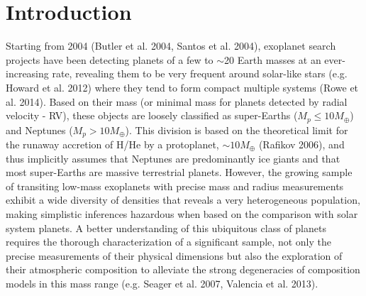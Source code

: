 \documentclass[traditabstract]{aa}
\begin{document}
\maketitle

\section{Introduction}

Starting from 2004 (Butler et al. 2004, Santos et al. 2004), exoplanet search projects have been 
detecting  planets of a few to $\sim$20 Earth masses at an ever-increasing rate, 
revealing them to  be very frequent around solar-like stars (e.g. Howard et al. 2012) where they 
tend to form compact multiple systems (Rowe et al. 2014). Based on their mass (or minimal mass 
for planets detected by radial velocity - RV), these objects are loosely classified as super-Earths 
($M_p \le 10 M_\oplus$) and Neptunes ($M_p > 10 M_\oplus$). This division is based on the 
theoretical limit for the runaway accretion of H/He by a protoplanet, $\sim 10 M_\oplus$ (Rafikov 
2006), and thus implicitly assumes that Neptunes are predominantly ice giants and that most 
super-Earths are massive terrestrial planets. However, the growing sample of transiting low-mass 
exoplanets with precise mass and radius measurements exhibit a wide diversity of densities that 
reveals a very heterogeneous population, making simplistic inferences hazardous  when based on the 
comparison with solar system planets. A better understanding of this ubiquitous class of planets 
requires the thorough characterization of a significant sample, not only the precise 
measurements  of their physical dimensions but also the exploration of their atmospheric 
composition to alleviate the strong degeneracies of composition models in this mass range 
(e.g. Seager et al. 2007, Valencia et al. 2013).
\end{document}
